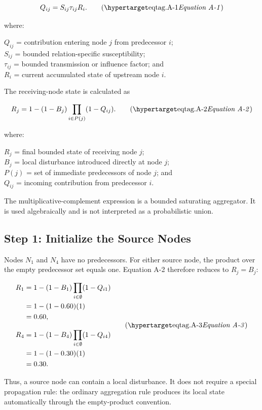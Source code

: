 \[
Q_{ij}=S_{ij}\tau_{ij}R_i.
\eqtag{A-1}
\]

where:

\noindent\(Q_{ij}\) = contribution entering node \(j\) from predecessor \(i\);\\
\noindent\(S_{ij}\) = bounded relation-specific susceptibility;\\
\noindent\(\tau_{ij}\) = bounded transmission or influence factor; and\\
\noindent\(R_i\) = current accumulated state of upstream node \(i\).

The receiving-node state is calculated as

\[
R_j=1-(1-B_j)\prod_{i\in P(j)}(1-Q_{ij}).
\eqtag{A-2}
\]

where:

\noindent\(R_j\) = final bounded state of receiving node \(j\);\\
\noindent\(B_j\) = local disturbance introduced directly at node \(j\);\\
\noindent\(P(j)\) = set of immediate predecessors of node \(j\); and\\
\noindent\(Q_{ij}\) = incoming contribution from predecessor \(i\).

The multiplicative-complement expression is a bounded saturating aggregator.
It is used algebraically and is not interpreted as a probabilistic union.

\subsection{Step 1: Initialize the Source Nodes}

Nodes \(N_1\) and \(N_4\) have no predecessors. For either source node, the
product over the empty predecessor set equals one. Equation A-2 therefore
reduces to \(R_j=B_j\):

\[
\begin{aligned}
R_1
  &=1-(1-B_1)\prod_{i\in\emptyset}(1-Q_{i1}) \\
  &=1-(1-0.60)(1) \\
  &=0.60,\\[0.5\baselineskip]
R_4
  &=1-(1-B_4)\prod_{i\in\emptyset}(1-Q_{i4}) \\
  &=1-(1-0.30)(1) \\
  &=0.30.
\end{aligned}
\eqtag{A-3}
\]

Thus, a source node can contain a local disturbance. It does not require a
special propagation rule: the ordinary aggregation rule produces its local
state automatically through the empty-product convention.

